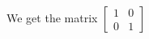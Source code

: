 \documentclass[preview]{standalone}
\begin{document}
\begin{minipage}
{8cm}We get the matrix $\begin{bmatrix} 1 & 0 \\ 0 & 1 \end{bmatrix}$
\end{minipage}
\end{document}
